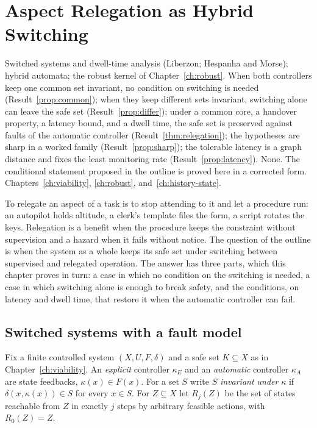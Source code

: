 \chapter{Aspect Relegation as Hybrid Switching}\label{ch:relegation}
{Switched systems and dwell-time analysis (Liberzon; Hespanha and Morse); hybrid automata; the robust kernel of Chapter~\ref{ch:robust}.}
{When both controllers keep one common set invariant, no condition on switching is needed (Result~\ref{prop:common}); when they keep different sets invariant, switching alone can leave the safe set (Result~\ref{prop:differ}); under a common core, a handover property, a latency bound, and a dwell time, the safe set is preserved against faults of the automatic controller (Result~\ref{thm:relegation}); the hypotheses are sharp in a worked family (Result~\ref{prop:sharp}); the tolerable latency is a graph distance and fixes the least monitoring rate (Result~\ref{prop:latency}).}
{None. The conditional statement proposed in the outline is proved here in a corrected form.}
{Chapters~\ref{ch:viability}, \ref{ch:robust}, and~\ref{ch:history-state}.}

To relegate an aspect of a task is to stop attending to it and let a procedure run: an autopilot holds altitude, a clerk's template files the form, a script rotates the keys. Relegation is a benefit when the procedure keeps the constraint without supervision and a hazard when it fails without notice. The question of the outline is when the system as a whole keeps its safe set under switching between supervised and relegated operation. The answer has three parts, which this chapter proves in turn: a case in which no condition on the switching is needed, a case in which switching alone is enough to break safety, and the conditions, on latency and dwell time, that restore it when the automatic controller can fail.

\section{Switched systems with a fault model}

Fix a finite controlled system $(X,U,F,\delta)$ and a safe set $K\subseteq X$ as in Chapter~\ref{ch:viability}. An \emph{explicit} controller $\kappa_E$ and an \emph{automatic} controller $\kappa_A$ are state feedbacks, $\kappa(x)\in F(x)$. For a set $S$ write $S$ \emph{invariant under} $\kappa$ if $\delta(x,\kappa(x))\in S$ for every $x\in S$. For $Z\subseteq X$ let $R_j(Z)$ be the set of states reachable from $Z$ in exactly $j$ steps by arbitrary feasible actions, with $R_0(Z)=Z$.

